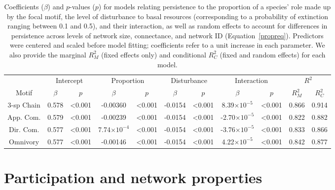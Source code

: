\documentclass[12pt]{article}
\begin{document}
\begin{spacing}{2.0}
    \begin{table}[ht!]
        \centering
        \caption{Coefficients ($\beta$) and $p$-values ($p$) for models relating persistence to the proportion of a species' role made up by the focal motif, the level of disturbance to basal resources (corresponding to a probability of extinction ranging between 0.1 and 0.5), and their interaction, as well as random effects to account for differences in persistence across levels of network size, connectance, and network ID  (Equation~\ref{propreq}). Predictors were centered and scaled before model fitting; coefficients refer to a unit increase in each parameter. We also provide the marginal $R^2_M$ (fixed effects only) and conditional $R^2_C$ (fixed and random effects) for each model.}
        \label{tab:proportion}                \footnotesize
        \begin{tabular}{c|c c | c c | c c | c c | c c |}
        & \multicolumn{2}{c|}{Intercept} & \multicolumn{2}{c|}{Proportion} & \multicolumn{2}{c|}{Disturbance} & \multicolumn{2}{c|}{Interaction} & \multicolumn{2}{c|}{$R^2$} \\
        Motif & $\beta$ & $p$ & $\beta$ & $p$ & $\beta$ & $p$ & $\beta$ & $p$ & $R^2_M$ & $R^2_C$ \\
        \hline
        3-sp Chain & 0.578 & \textless0.001 & -0.00360 & \textless0.001 & -0.0154 & \textless0.001 & 8.39$\times10^{-5}$& \textless0.001 & 0.866 & 0.914 \\
        App. Com. & 0.579 & \textless0.001 & -0.00239 & \textless0.001 & -0.0154 & \textless0.001 & -2.70$\times10^{-5}$ & \textless0.001 & 0.822 & 0.882 \\
        Dir. Com. & 0.577 & \textless0.001 & 7.74$\times10^{-4}$ & \textless0.001 & -0.0154 & \textless0.001 & -3.76$\times10^{-5}$ & \textless0.001 & 0.833 & 0.866 \\
        Omnivory & 0.577 & \textless0.001 & -0.00146 & \textless0.001 & -0.0154 & \textless0.001 & 4.22$\times10^{-5}$ & \textless0.001 & 0.842 & 0.877 \\
        \end{tabular}
    \end{table}        
\clearpage     

\section{Participation and network properties}



\end{spacing}
\end{document}
